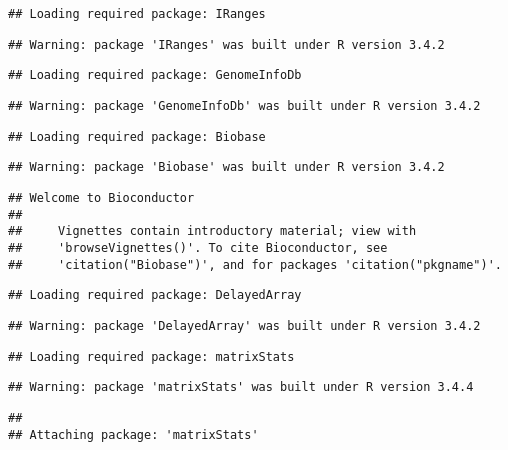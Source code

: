 \documentclass[]{article}
\begin{document}
\begin{verbatim}
## Loading required package: IRanges
\end{verbatim}

\begin{verbatim}
## Warning: package 'IRanges' was built under R version 3.4.2
\end{verbatim}

\begin{verbatim}
## Loading required package: GenomeInfoDb
\end{verbatim}

\begin{verbatim}
## Warning: package 'GenomeInfoDb' was built under R version 3.4.2
\end{verbatim}

\begin{verbatim}
## Loading required package: Biobase
\end{verbatim}

\begin{verbatim}
## Warning: package 'Biobase' was built under R version 3.4.2
\end{verbatim}

\begin{verbatim}
## Welcome to Bioconductor
## 
##     Vignettes contain introductory material; view with
##     'browseVignettes()'. To cite Bioconductor, see
##     'citation("Biobase")', and for packages 'citation("pkgname")'.
\end{verbatim}

\begin{verbatim}
## Loading required package: DelayedArray
\end{verbatim}

\begin{verbatim}
## Warning: package 'DelayedArray' was built under R version 3.4.2
\end{verbatim}

\begin{verbatim}
## Loading required package: matrixStats
\end{verbatim}

\begin{verbatim}
## Warning: package 'matrixStats' was built under R version 3.4.4
\end{verbatim}

\begin{verbatim}
## 
## Attaching package: 'matrixStats'
\end{verbatim}
\end{document}
